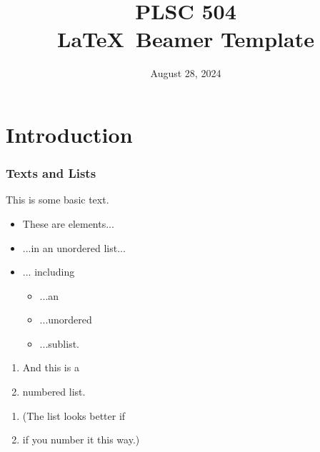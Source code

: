 \documentclass[10pt]{beamer}
\newcommand{\nin}{\noindent}
\newcommand{\be}{\begin{enumerate}}
\newcommand{\ee}{\end{enumerate}}
\newcommand{\bi}{\begin{itemize}}
\newcommand{\ei}{\end{itemize}}
\newcommand{\+}{\item}
\newcommand{\?}{\item[$\cdot$]}
\newcommand{\0}{\mathbf{0}}
\newcommand{\1}{\mathbf{1}}
\begin{document}

\title{\huge {\bf PLSC 504} \\ \LaTeX~Beamer Template}
\date{August 28, 2024}

\frame{\titlepage}  %


\section{Introduction}

\begin{frame}[fragile] \frametitle{Texts and Lists}

\nin This is some basic text.

\bi

\+ These are elements...

\+ ...in an unordered list...

\+ ... including
   \bi
   \? ...an
   \? ...unordered
   \? ...sublist. 
   \ei
\ei

\be
\+ And this is a 
\+ numbered list.
\ee

\be
\+[1.] (The list looks better if 
\+[2.] if you number it this way.)
\ee


\end{frame}
\end{document}
